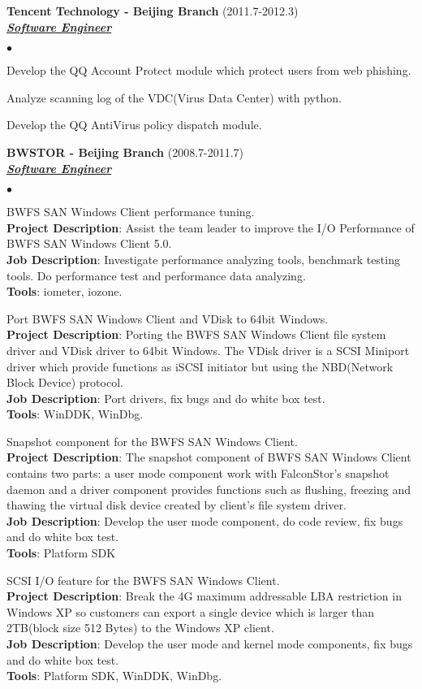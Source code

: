 \documentclass{article}
\newcommand{\employer}[3]{{ \textbf{#1} (#2)\\ \underline{\textbf{\emph{#3}}}\\}}
\newcommand{\project}[4]{{#1}\\ \textbf{Project Description}:
  {#2}\\ \textbf{Job Description}: {#3}\\ \textbf{Tools}: {#4}\vspace*{3pt}}
\newenvironment{achievements}{\begin{list}{$\bullet$}{\topsep 0pt \itemsep -2pt}}{\vspace*{6pt}\end{list}}
\begin{document}
\employer{Tencent Technology - Beijing Branch}{2011.7-2012.3} {Software Engineer}
\begin{achievements}
\item Develop the QQ Account Protect module which protect users from web phishing.
\item Analyze scanning log of the VDC(Virus Data Center) with python.
\item Develop the QQ AntiVirus policy dispatch module.
\end{achievements}

\employer{BWSTOR - Beijing Branch}{2008.7-2011.7}{Software Engineer}
\begin{achievements}
\item 
  \project{BWFS SAN Windows Client performance tuning.}
          {Assist the team leader to improve the I/O Performance of BWFS SAN Windows Client 5.0.}
          {Investigate performance analyzing tools, benchmark testing tools. Do performance test and performance data analyzing.}
          {iometer, iozone.}

\item 
  \project{Port BWFS SAN Windows Client and VDisk to 64bit Windows.}
          {Porting the BWFS SAN Windows Client file system driver and VDisk driver to 64bit Windows. The VDisk driver is a SCSI Miniport driver which provide functions as iSCSI initiator but using the NBD(Network Block Device) protocol.}
          {Port drivers, fix bugs and do white box test.}
          {WinDDK, WinDbg.}

\item 
  \project{Snapshot component for the BWFS SAN Windows Client.}
          {The snapshot component of BWFS SAN Windows Client contains two parts: a user mode component work with FalconStor's snapshot daemon and a driver component provides functions such as flushing, freezing and thawing the virtual disk device created by client's file system driver.}
          {Develop the user mode component, do code review, fix bugs and do white box test.}
          {Platform SDK}

\item 
  \project{SCSI I/O feature for the BWFS SAN Windows Client.}
          {Break the 4G maximum addressable LBA restriction in Windows XP so customers can export a single device which is larger than 2TB(block size 512 Bytes) to the Windows XP client.}
          {Develop the user mode and kernel mode components, fix bugs and do white box test.}
          {Platform SDK, WinDDK, WinDbg.}


\end{achievements}
\end{document}
